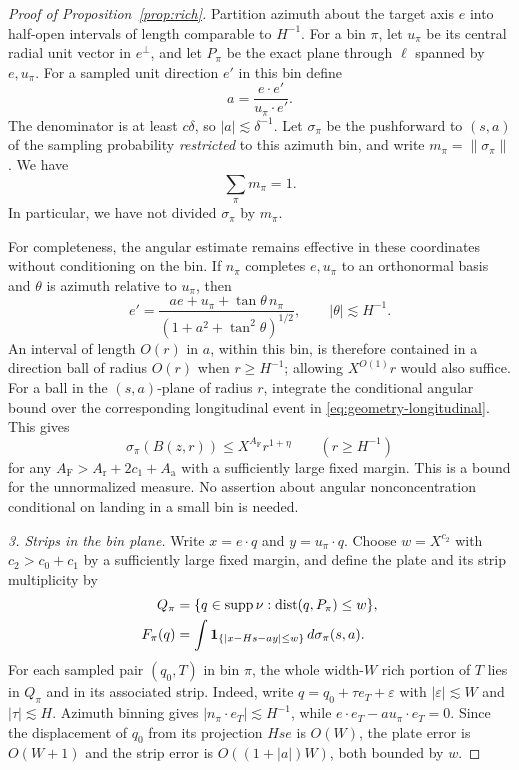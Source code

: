 \begin{proof}[Proof of Proposition~\ref{prop:rich}]
Partition azimuth about the target axis $e$ into half-open intervals
of length comparable to $H^{-1}$. For a bin $\pi$, let $u_\pi$ be
its central radial unit vector in $e^\perp$, and let $P_\pi$ be the
exact plane through $\ell$ spanned by $e,u_\pi$. For a sampled unit
direction $e'$ in this bin define
\[
 a=\frac{e\cdot e'}{u_\pi\cdot e'}.
\]
The denominator is at least $c\delta$, so $|a|\lesssim\delta^{-1}$.
Let $\sigma_\pi$ be the pushforward to $(s,a)$ of the sampling
probability \emph{restricted} to this azimuth bin, and write
$m_\pi=\|\sigma_\pi\|$. We have
\begin{equation}\label{eq:geometry-bin-masses}
 \sum_\pi m_\pi=1.
\end{equation}
In particular, we have not divided $\sigma_\pi$ by $m_\pi$.

For completeness, the angular estimate remains effective in these
coordinates without conditioning on the bin. If $n_\pi$ completes
$e,u_\pi$ to an orthonormal basis and $\theta$ is azimuth relative
to $u_\pi$, then
\[
 e'=\frac{ae+u_\pi+\tan\theta\,n_\pi}
             {(1+a^2+\tan^2\theta)^{1/2}},
 \qquad |\theta|\lesssim H^{-1}.
\]
An interval of length $O(r)$ in $a$, within this bin, is therefore
contained in a direction ball of radius $O(r)$ when $r\geq H^{-1}$;
allowing $X^{O(1)}r$ would also suffice. For a ball in the
$(s,a)$-plane of radius $r$, integrate the conditional angular bound
over the corresponding longitudinal event in
\eqref{eq:geometry-longitudinal}. This gives
\begin{equation}\label{eq:geometry-joint-frostman}
 \sigma_\pi(B(z,r))\leq X^{A_{\mathrm F}}r^{1+\eta}
 \qquad(r\geq H^{-1})
\end{equation}
for any $A_{\mathrm F}>A_{\mathrm r}+2c_1+A_{\mathrm a}$ with a
sufficiently large fixed margin. This is a bound for the
unnormalized measure. No assertion about angular nonconcentration
conditional on landing in a small bin is needed.

\emph{3. Strips in the bin plane.}
Write $x=e\cdot q$ and $y=u_\pi\cdot q$. Choose
$w=X^{c_2}$ with $c_2>c_0+c_1$ by a sufficiently large fixed margin,
and define the plate and its strip multiplicity by
\begin{align}
 Q_\pi&=\{q\in\operatorname{supp}\nu:\operatorname{dist}(q,P_\pi)\leq w\},\notag\\
 F_\pi(q)&=\int
  \mathbf1_{\{|x-Hs-ay|\leq w\}}\,d\sigma_\pi(s,a).
 \label{eq:geometry-strip-multiplicity}
\end{align}
For each sampled pair $(q_0,T)$ in bin $\pi$, the whole width-$W$
rich portion of $T$ lies in $Q_\pi$ and in its associated strip.
Indeed, write
$q=q_0+\tau e_T+\varepsilon$ with $|\varepsilon|\lesssim W$ and
$|\tau|\lesssim H$. Azimuth binning gives
$|n_\pi\cdot e_T|\lesssim H^{-1}$, while
$e\cdot e_T-a u_\pi\cdot e_T=0$. Since the displacement of $q_0$
from its projection $Hs e$ is $O(W)$, the plate error is $O(W+1)$
and the strip error is $O((1+|a|)W)$, both bounded by $w$.


\end{proof}
